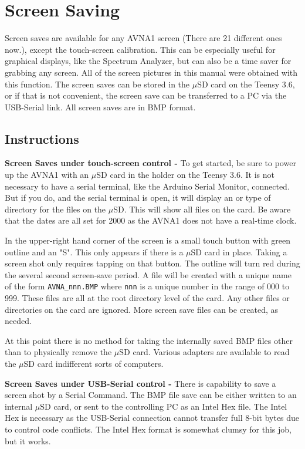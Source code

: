 \section{Screen Saving}
\label{sect:SSave}
Screen saves are available for any AVNA1 screen (There are 21 different ones now.), except the touch-screen calibration.   This can be especially useful for graphical displays, like the Spectrum Analyzer, but can also be a time saver for grabbing any screen.  All of the screen pictures in this manual were obtained with this function.  The screen saves can be stored in the $\mu$SD card on the Teensy 3.6, or if that is not convenient, the screen save can be transferred  to a PC  via the USB-Serial link.  All screen saves are in BMP format.

\subsection{Instructions}
\label{subsect:SSaveInstr}
\textbf{Screen Saves under touch-screen control - } To get started,  be sure to power up the AVNA1 with  an $\mu$SD card in the holder on the Teensy 3.6.  It is not necessary to have a serial terminal, like the Arduino Serial Monitor, connected.  But if you do, and the serial terminal is open, it will display an  or  type of directory for the files on the $\mu$SD.  This will show all files on the card.   Be aware that the dates are all set for 2000 as the AVNA1 does not have a real-time clock.

In the upper-right hand corner of the screen is a small touch button with green outline and an "S".  This only appears if there is a $\mu$SD card in place.  Taking a screen shot only requires tapping on that button.  The outline will turn red during the several second screen-save period.  A file will be created with a unique name of
the form \texttt{AVNA\_nnn.BMP} where \texttt{nnn} is a unique number in the range of 000 to 999.  These files are all at the root directory level of the card.  Any other files or directories on the card are ignored.  More screen save files can be created, as needed.

At this point there is no method for taking the internally saved BMP files other than to physically remove the $\mu$SD card.  Various adapters are available to read the  $\mu$SD card indifferent sorts of computers.

\textbf{Screen Saves under USB-Serial control - } There is capability to save a screen shot by a Serial Command.  The BMP file save can be either written to an internal $\mu$SD card, or  sent to the controlling PC as an Intel Hex file.  The Intel Hex is necessary as the USB-Serial connection cannot transfer full 8-bit bytes due to control code conflicts.  The Intel Hex format is somewhat clumsy for this job, but it works.

